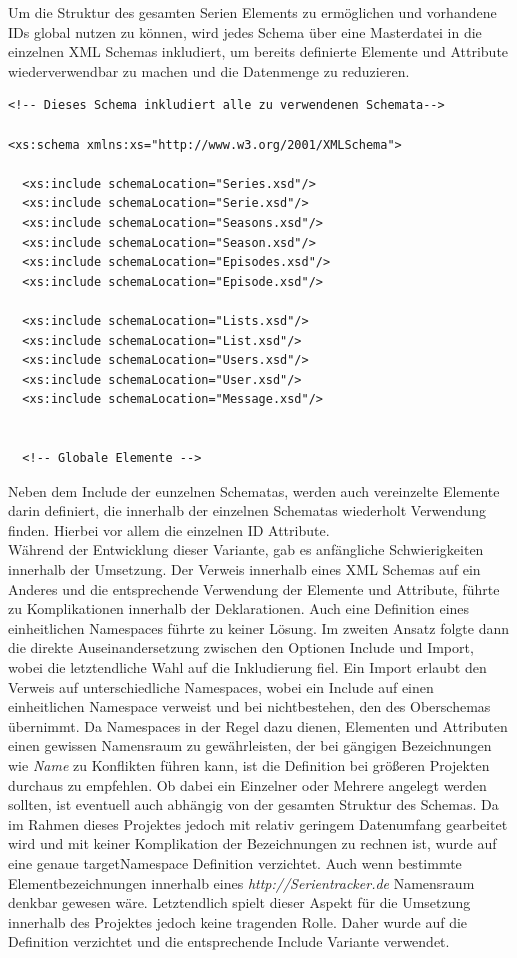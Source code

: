\documentclass[a4paper]{article}
\begin{document}
\parskip 12pt
\parindent 0pt
Um die Struktur des gesamten Serien Elements zu ermöglichen und vorhandene IDs global nutzen zu können, wird jedes Schema über eine Masterdatei in die einzelnen XML Schemas inkludiert, um bereits definierte Elemente und Attribute wiederverwendbar zu machen und die Datenmenge zu reduzieren.

\begin{lstlisting}[label=xsd-definition,caption= Auszug aus der Masterinklude Serientracker.xsd]
<!-- Dieses Schema inkludiert alle zu verwendenen Schemata-->

<xs:schema xmlns:xs="http://www.w3.org/2001/XMLSchema">

  <xs:include schemaLocation="Series.xsd"/>
  <xs:include schemaLocation="Serie.xsd"/>
  <xs:include schemaLocation="Seasons.xsd"/>
  <xs:include schemaLocation="Season.xsd"/>
  <xs:include schemaLocation="Episodes.xsd"/>
  <xs:include schemaLocation="Episode.xsd"/>

  <xs:include schemaLocation="Lists.xsd"/>
  <xs:include schemaLocation="List.xsd"/>
  <xs:include schemaLocation="Users.xsd"/>
  <xs:include schemaLocation="User.xsd"/>
  <xs:include schemaLocation="Message.xsd"/>


  <!-- Globale Elemente -->
\end{lstlisting}

Neben dem Include der eunzelnen Schematas, werden auch vereinzelte Elemente darin definiert, die innerhalb der einzelnen Schematas wiederholt Verwendung finden. Hierbei vor allem die einzelnen ID Attribute. \\

Während der Entwicklung dieser Variante, gab es anfängliche Schwierigkeiten innerhalb der Umsetzung. Der Verweis innerhalb eines XML Schemas auf ein Anderes und die entsprechende Verwendung der Elemente und Attribute, führte zu Komplikationen innerhalb der Deklarationen. Auch eine Definition eines einheitlichen Namespaces führte zu keiner Lösung. Im zweiten Ansatz folgte dann die direkte Auseinandersetzung zwischen den Optionen Include und Import, wobei die letztendliche Wahl auf die Inkludierung fiel. Ein Import erlaubt den Verweis auf unterschiedliche Namespaces, wobei ein Include auf einen einheitlichen Namespace verweist und bei nichtbestehen, den des Oberschemas übernimmt.
Da Namespaces in der Regel dazu dienen, Elementen und Attributen einen gewissen Namensraum zu gewährleisten, der bei gängigen Bezeichnungen wie \textit{Name} zu Konflikten führen kann, ist die Definition bei größeren Projekten durchaus zu empfehlen. Ob dabei ein Einzelner oder Mehrere angelegt werden sollten, ist eventuell auch abhängig von der gesamten Struktur des Schemas. Da im Rahmen dieses Projektes jedoch mit relativ geringem Datenumfang gearbeitet wird und mit keiner Komplikation der Bezeichnungen zu rechnen ist, wurde auf eine genaue targetNamespace Definition verzichtet. Auch wenn bestimmte Elementbezeichnungen innerhalb eines \textit{http://Serientracker.de} Namensraum denkbar gewesen wäre. Letztendlich spielt dieser Aspekt für die Umsetzung innerhalb des Projektes jedoch keine tragenden Rolle. Daher wurde auf die Definition verzichtet und die entsprechende Include Variante verwendet. 
\end{document}
